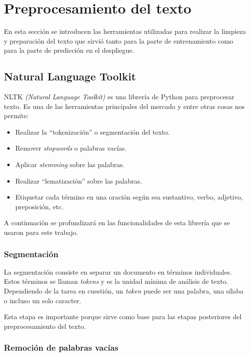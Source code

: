\section{Preprocesamiento del texto}

En esta sección se introducen las herramientas utilizadas para realizar la limpieza y preparación del texto que sirvió tanto para la parte de entrenamiento como para la parte de predicción en el despliegue.

\subsection{Natural Language Toolkit}

NLTK \textit{(Natural Language Toolkit)} es una librería de Python para preprocesar texto. Es una de las herramientas principales del mercado y entre otras cosas nos permite:
\begin{itemize}
\item Realizar la ``tokenización'' o segmentación del texto.
\item Remover \textit{stopwords} o palabras vacías.
\item Aplicar \textit{stemming} sobre las palabras.
\item Realizar ``lematización'' sobre las palabras.
\item Etiquetar cada término en una oración según sea sustantivo, verbo, adjetivo, preposición, etc.
\end{itemize}

A continuación se profundizará en las funcionalidades de esta librería que se usaron para este trabajo.

\subsubsection{Segmentación}

La segmentación consiste en separar un documento en términos individuales. Estos términos se llaman \textit{tokens} y es la unidad mínima de análisis de texto. Dependiendo de la tarea en cuestión, un \textit{token} puede ser una palabra, una sílaba o incluso un solo caracter.

Esta etapa es importante porque sirve como base para las etapas posteriores del preprocesamiento del texto.

\subsubsection{Remoción de palabras vacías}

